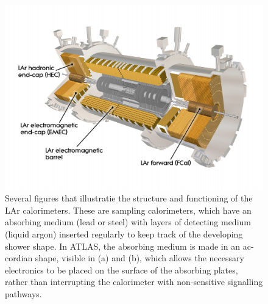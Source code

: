 \begin{english}
\begin{figure}[hbtp]
\begin{minipage}[b]{.59\textwidth}
    \begin{center}
    \includegraphics[width=1\textwidth]{figures/CaloDiag.png}
    \end{center}
\end{minipage}
\begin{minipage}[b]{.4\textwidth}
\caption{Several figures \cite{atlasweb} that illustratie the structure and functioning of the LAr calorimeters. These are sampling calorimeters, which have an absorbing medium (lead or steel) with layers of detecting medium (liquid argon) inserted regularly to keep track of the developing shower shape. In ATLAS, the absorbing medium is made in an accordian shape, visible in (a) and (b), which allows the necessary electronics to be placed on the surface of the absorbing plates, rather than interrupting the calorimeter with non-sensitive signalling pathways.}
\label{calostruc}
\end{minipage}
\end{figure}


\end{english}
